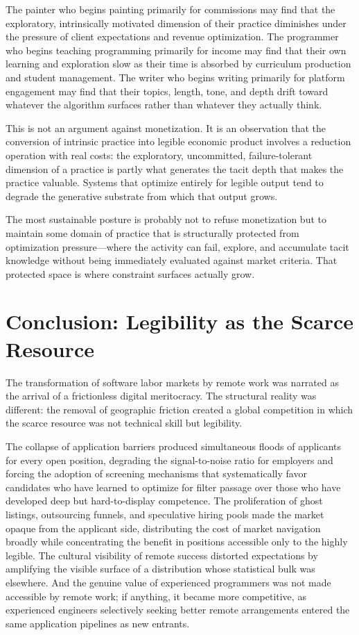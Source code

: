 \documentclass[12pt, a4paper]{article}
\theoremstyle{plain}
\theoremstyle{definition}
\theoremstyle{remark}
\begin{document}
The painter who begins painting primarily for commissions
may find that the exploratory, intrinsically motivated dimension of their practice
diminishes under the pressure of client expectations and revenue optimization.
The programmer who begins teaching programming primarily for income
may find that their own learning and exploration slow as their time
is absorbed by curriculum production and student management.
The writer who begins writing primarily for platform engagement
may find that their topics, length, tone, and depth drift toward
whatever the algorithm surfaces rather than whatever they actually think.

This is not an argument against monetization. It is an observation
that the conversion of intrinsic practice into legible economic product
involves a reduction operation with real costs:
the exploratory, uncommitted, failure-tolerant dimension of a practice
is partly what generates the tacit depth that makes the practice valuable.
Systems that optimize entirely for legible output tend to degrade
the generative substrate from which that output grows.

The most sustainable posture is probably not to refuse monetization
but to maintain some domain of practice that is structurally protected
from optimization pressure---where the activity can fail, explore,
and accumulate tacit knowledge without being immediately evaluated
against market criteria.
That protected space is where constraint surfaces actually grow.

\section{Conclusion: Legibility as the Scarce Resource}
\label{sec:conclusion}

The transformation of software labor markets by remote work
was narrated as the arrival of a frictionless digital meritocracy.
The structural reality was different: the removal of geographic friction
created a global competition in which the scarce resource
was not technical skill but legibility.

The collapse of application barriers produced simultaneous floods of applicants
for every open position, degrading the signal-to-noise ratio for employers
and forcing the adoption of screening mechanisms that systematically favor
candidates who have learned to optimize for filter passage
over those who have developed deep but hard-to-display competence.
The proliferation of ghost listings, outsourcing funnels,
and speculative hiring pools made the market opaque from the applicant side,
distributing the cost of market navigation broadly
while concentrating the benefit in positions accessible only to the highly legible.
The cultural visibility of remote success distorted expectations
by amplifying the visible surface of a distribution
whose statistical bulk was elsewhere.
And the genuine value of experienced programmers was not made accessible
by remote work; if anything, it became more competitive,
as experienced engineers selectively seeking better remote arrangements
entered the same application pipelines as new entrants.
\end{document}
